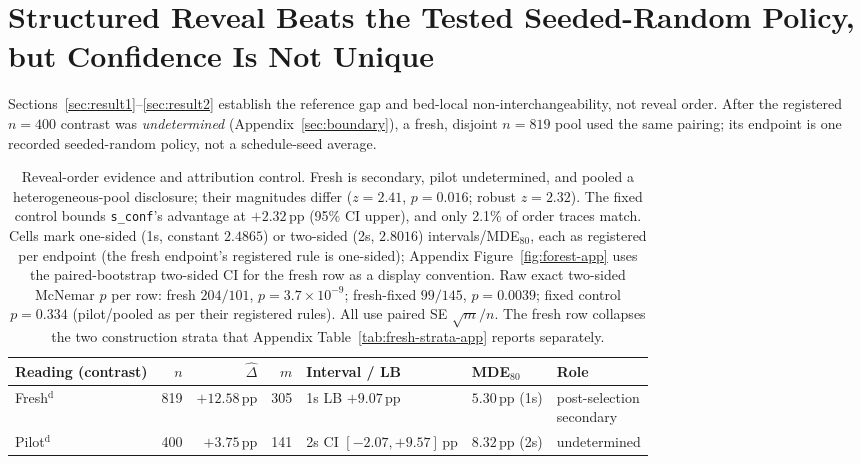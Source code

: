 \documentclass{article}
\newcommand{\sconf}{\texttt{s\_conf}}
\newcommand{\pp}{\,\mathrm{pp}}
\begin{document}
\section{Structured Reveal Beats the Tested Seeded-Random Policy, but Confidence Is Not Unique}
\label{sec:result3}

Sections~\ref{sec:result1}--\ref{sec:result2} establish the reference gap and
bed-local non-interchangeability, not reveal order.  After the registered
$n{=}400$ contrast was \emph{undetermined} (Appendix~\ref{sec:boundary}), a
fresh, disjoint $n{=}819$ pool used the same pairing; its endpoint is one
recorded seeded-random policy, not a schedule-seed average.

\begin{table}[t]
\centering
\footnotesize
\setlength{\parskip}{1pt}
\setlength{\tabcolsep}{1.9pt}
\caption{Reveal-order evidence and attribution control.  Fresh is secondary,
pilot undetermined, and pooled a heterogeneous-pool disclosure; their
magnitudes differ ($z{=}2.41$, $p{=}0.016$; robust $z{=}2.32$).  The fixed
control bounds \sconf{}'s advantage at $+2.32\pp$ (95\% CI upper), and only
2.1\% of order traces match.  Cells mark one-sided (1s, constant $2.4865$) or
two-sided (2s, $2.8016$) intervals/MDE$_{80}$, each as registered per endpoint
(the fresh endpoint's registered rule is one-sided); Appendix Figure~\ref{fig:forest-app}
uses the paired-bootstrap two-sided CI for the fresh row as a display
convention.  Raw exact two-sided McNemar $p$ per row: fresh $204/101$,
$p{=}3.7\!\times\!10^{-9}$; fresh-fixed $99/145$, $p{=}0.0039$; fixed
control $p{=}0.334$ (pilot/pooled as per their registered rules).
All use paired SE $\sqrt{m}/n$.  The fresh row collapses the two construction
strata that Appendix Table~\ref{tab:fresh-strata-app} reports separately.}
\label{tab:reveal-order-batches}
\begin{tabular*}{\textwidth}{@{\extracolsep{\fill}}lrrrlll@{}}
\toprule
Reading (contrast) & $n$ & $\widehat\Delta$ & $m$ & Interval / LB & MDE$_{80}$ & Role \\
\midrule
Fresh$^{\mathrm{d}}$ & 819 & $+12.58\pp$ & 305 & \shortstack[l]{1s LB\\$+9.07\pp$} & \shortstack[l]{$5.30\pp$\\(1s)} & \shortstack[l]{post-selection\\secondary} \\
Pilot$^{\mathrm{d}}$ & 400 & $+3.75\pp$ & 141 & \shortstack[l]{2s CI\\$[-2.07,+9.57]\pp$} & \shortstack[l]{$8.32\pp$\\(2s)} & undetermined \\

\end{tabular*}
\end{table}
\end{document}
